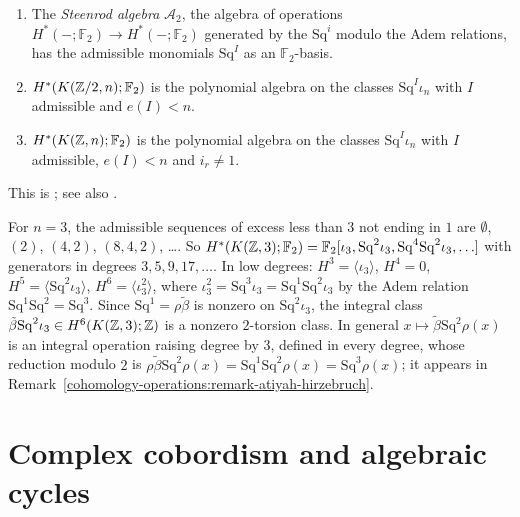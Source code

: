 \begin{theorem}[Serre]\label{cohomology-operations:theorem-serre}
\begin{enumerate}
\item The \emph{Steenrod algebra} $\mathcal{A}_2$, the algebra of operations $H^*(-; \mathbb{F}_2) \to H^*(-; \mathbb{F}_2)$ generated by the $\mathrm{Sq}^i$ modulo the Adem relations, has
the admissible monomials $\mathrm{Sq}^I$ as an $\mathbb{F}_2$-basis.
\item $H^*(K(\mathbb{Z}/2, n); \mathbb{F}_2)$ is the polynomial algebra on the classes $\mathrm{Sq}^I\iota_n$ with $I$ admissible and $e(I) < n$.
\item $H^*(K(\mathbb{Z}, n); \mathbb{F}_2)$ is the polynomial algebra on the classes $\mathrm{Sq}^I\iota_n$ with $I$ admissible, $e(I) < n$ and $i_r \neq 1$.
\end{enumerate}
\end{theorem}

This is \cite{serre-1953}; see also \cite{mosher-tangora}.

\begin{example}\label{cohomology-operations:example-k-z-3}
For $n = 3$, the admissible sequences of excess less than $3$ not ending in $1$ are $\emptyset$, $(2)$, $(4, 2)$, $(8, 4, 2)$, \ldots. So
$H^*(K(\mathbb{Z}, 3); \mathbb{F}_2) = \mathbb{F}_2[\iota_3, \mathrm{Sq}^2\iota_3, \mathrm{Sq}^4\mathrm{Sq}^2\iota_3, \ldots]$ with generators in degrees $3, 5, 9, 17, \ldots$. In low degrees:
$H^3 = \langle \iota_3 \rangle$, $H^4 = 0$, $H^5 = \langle \mathrm{Sq}^2\iota_3 \rangle$, $H^6 = \langle \iota_3^2 \rangle$, where $\iota_3^2 = \mathrm{Sq}^3\iota_3 = \mathrm{Sq}^1\mathrm{Sq}^2\iota_3$ by the Adem
relation $\mathrm{Sq}^1\mathrm{Sq}^2 = \mathrm{Sq}^3$. Since $\mathrm{Sq}^1 = \rho\tilde\beta$ is nonzero on $\mathrm{Sq}^2\iota_3$, the integral class $\tilde\beta\mathrm{Sq}^2\iota_3 \in H^6(K(\mathbb{Z}, 3); \mathbb{Z})$ is a nonzero
$2$-torsion class. In general $x \mapsto \tilde\beta\mathrm{Sq}^2\rho(x)$ is an integral operation raising degree by $3$, defined in every degree, whose reduction modulo $2$ is
$\rho\tilde\beta\mathrm{Sq}^2\rho(x) = \mathrm{Sq}^1\mathrm{Sq}^2\rho(x) = \mathrm{Sq}^3\rho(x)$; it appears in Remark~\ref{cohomology-operations:remark-atiyah-hirzebruch}.
\end{example}

\section{Complex cobordism and algebraic cycles}\label{cohomology-operations:section-cobordism}

